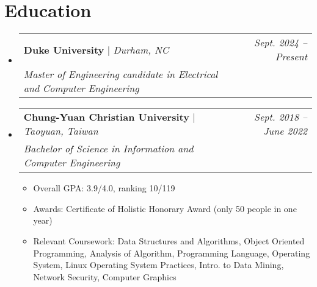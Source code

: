 \documentclass[letterpaper,11pt]{article}
\makeatletter
\newcommand{\subheadingtitlevspace}{
\vspace{-3pt}
}
\newcommand{\resumeItem}[1]{
  \item{
    {#1 \vspace{-4pt}}
  }
}
\newcommand{\resumeSubheading}[4]{
   \item
     \begin{tabular*}{0.97\textwidth}[t]{l@{\extracolsep{\fill}}r}
       \textbf{#1} | \emph{#2} & \textit{#4}\\
       \textit{#3} \\
     \end{tabular*}\vspace{-8pt}
 }
\newcommand{\resumeSubHeadingListStart}{\subheadingtitlevspace\begin{itemize}[leftmargin=0.15in, label={}]}
\newcommand{\resumeSubHeadingListEnd}{\end{itemize}}
\newcommand{\resumeItemListStart}{
\begin{itemize}}
\newcommand{\resumeItemListEnd}{
\end{itemize}\vspace{-8pt}}
\makeatother
\begin{document}


\section{Education}
  \resumeSubHeadingListStart
    \resumeSubheading
      {Duke University}{Durham, NC}
      {Master of Engineering candidate in Electrical and Computer Engineering} 
      {Sept. 2024 -- Present} %
    \resumeSubheading
      {Chung-Yuan Christian University} {Taoyuan, Taiwan}
      {Bachelor of Science in Information and Computer Engineering} 
      {Sept. 2018 -- June 2022}
    \resumeItemListStart
      \resumeItem{Overall GPA: 3.9/4.0, ranking 10/119}
      \resumeItem{Awards: Certificate of Holistic Honorary Award (only 50 people in one year)}
      \resumeItem{Relevant Coursework: Data Structures and Algorithms, Object Oriented Programming, Analysis of Algorithm, Programming Language, Operating System, Linux Operating System Practices, Intro. to Data Mining, Network Security, Computer Graphics} 
    \resumeItemListEnd
  \resumeSubHeadingListEnd

   
\end{document}
